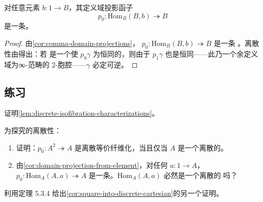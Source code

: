 \begin{corollary}[由元素出发的定义域投影]\label{cor:domain-projection-from-element}
对任意元素 $b\colon 1\to B$，其定义域投影函子
\[
p_{0}\colon\mathrm{Hom}_{B}(B,b)\twoheadrightarrow B
\]
是一条\trDiscreteCartesianFibration。
\end{corollary}

\begin{proof}
由\cref{cor:comma-domain-projections}，
$p_{0}\colon\mathrm{Hom}_{B}(B,b)\twoheadrightarrow B$ 是一条%
\trCartesianFibration。离散性由\trTwoCellConservativity{}得出：若
是一个使 $p_{0}\gamma$ 为恒同的\trNaturalTransformation，则由于 $p_{1}\gamma$
也是恒同——此乃一个余定义域为\trTerminal{}∞-范畴的 2-胞腔——$\gamma$ 必定可逆。
\end{proof}


\subsection*{练习}

\begin{exercise}\label{ex:prove-discrete-isofibration-lemma}
证明\cref{lem:discrete-isofibration-characterizations}。
\end{exercise}

\begin{exercise}\label{ex:discreteness-exploration}
为探究\trDiscreteCartesianFibration{}的离散性：
\begin{enumerate}[label=(\roman*)]
\item 证明：$p_{0}\colon A^{2}\twoheadrightarrow A$ 是离散等价纤维化，当且仅当
$A$ 是一个离散的\trInfinityCategory。
\item 由\cref{cor:domain-projection-from-element}，对任何\trElement{}
$a\colon 1\to A$，$p_{0}\colon\mathrm{Hom}_{A}(A,a)\twoheadrightarrow A$
是一条\trDiscreteCartesianFibration。$\mathrm{Hom}_{A}(A,a)$ 必然是一个离散的%
\trInfinityCategory{}吗？
\end{enumerate}
\end{exercise}

\begin{exercise}\label{ex:alternate-proof-cartesian-functor}
利用定理 5.3.4 给出\cref{cor:square-into-discrete-cartesian}的另一个证明。
\end{exercise}
